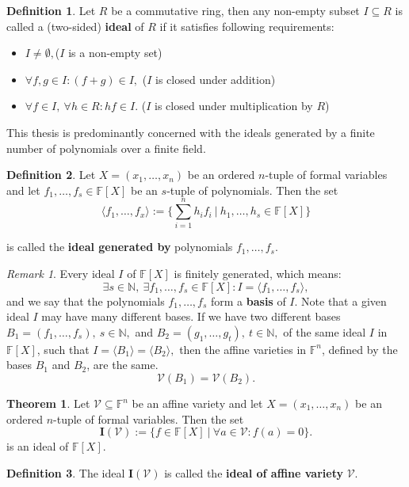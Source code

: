 \documentclass[thesis=M,english]{FITthesis}[2012/10/20]
\theoremstyle{remark}
\newtheorem*{RM}{Remark}
\theoremstyle{definition}
\newtheorem{DF}{Definition}[section]
\newtheorem{theorem}{Theorem}[section]
\begin{document}
 \begin{DF}
Let $R$ be a commutative ring, then any non-empty subset $I \subseteq R$ is called a (two-sided) \textbf{ideal} of $R$ if it satisfies following requirements:
\begin{itemize}
\item $I \neq \emptyset,$\hfill ($I$ is a non-empty set)
\item $\forall f,g \in I: (f + g) \in I,$ \hfill ($I$ is closed under addition)
\item $\forall f \in I,\ \forall h \in R: hf \in I.$ \hfill ($I$ is closed under multiplication by $R$)
\end{itemize}
\end{DF}
\noindent This thesis is predominantly concerned with the ideals generated by a finite number of polynomials over a finite field.
\begin{DF}
Let $X = (x_1, \ldots ,x_n)$ be an ordered $n$-tuple of formal variables and let $f_1,\ldots,f_s \in \mathbb{F}[X] $ be an $s$-tuple of polynomials. Then the set
$$
\langle f_1, \ldots, f_x \rangle := \{ \sum_{i=1}^n h_if_i\ |\ h_1,\ldots,h_s \in \mathbb{F}[X]\}
$$
\end{DF}
\noindent is called the \textbf{ideal generated by} polynomials $f_1,\ldots,f_s$.
\begin{RM}
Every ideal $I$ of $\mathbb{F}[X]$ is finitely generated, which means:
$$
\exists s \in \mathbb{N},\ \exists f_1,\ldots,f_s \in \mathbb{F}[X]: I = \langle f_1, \ldots, f_s \rangle,
$$
\noindent and we say that the polynomials $f_1,\ldots,f_s$ form a \textbf{basis} of $I$. Note that a given ideal $I$ may have many different bases. If we have two different bases $B_1 = (f_1,\ldots,f_s),\ s \in \mathbb{N},$ and $B_2 = (g_1, \ldots, g_t),\ t \in \mathbb{N},$ of the same ideal $I$ in $\mathbb{F}[X]$, such that $I = \langle B_1\rangle = \langle B_2 \rangle,$ then the affine varieties ${\text{in }\mathbb{F}^n}$, defined by the bases $B_1$ and $B_2$, are the same.
$$
\mathcal{V}(B_1) = \mathcal{V}(B_2).
$$
\end{RM}
\begin{theorem}
Let $\mathcal{V} \subseteq \mathbb{F}^n$ be an affine variety and let $X = (x_1, \ldots ,x_n)$ be an ordered $n$-tuple of formal variables. Then the set 
$$
\mathbf{I}(\mathcal{V}) := \{ f \in \mathbb{F}[X]\ |\ \forall a \in \mathcal{V}: f(a) = 0\}.
$$
is an ideal of $\mathbb{F}[X]$.
\end{theorem}
\begin{DF}
The ideal $\mathbf{I}(\mathcal{V})$ is called the \textbf{ideal of affine variety} $\mathcal{V}$.
\end{DF}
\end{document}
